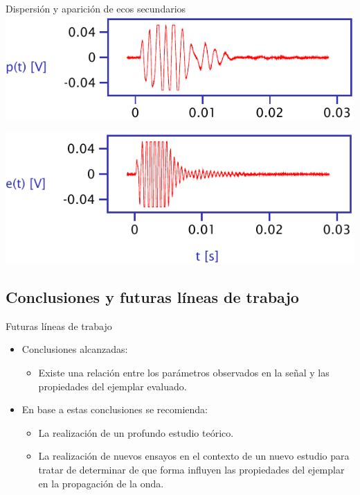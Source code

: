 \documentclass[utf8, compress]			{beamer}
\begin{document}
\begin{frame}{Dispersión y aparición de ecos secundarios}
    \includegraphics{scattering-palmera.pdf}\par
    \includegraphics{scattering-eucalipto.pdf}
\end{frame}


\subsection{Conclusiones y futuras líneas de trabajo}

\begin{frame}{Futuras líneas de trabajo}
    \begin{itemize}
	\item Conclusiones alcanzadas:
	    \begin{itemize}
		\item Existe una relación entre los parámetros observados
		    en la señal y las propiedades del ejemplar evaluado.
	    \end{itemize}
	\item En base a estas conclusiones se recomienda:
	    \begin{itemize}
		\item La realización de un profundo estudio teórico.
		\item La realización de nuevos ensayos en el contexto de un
		    nuevo estudio para tratar de determinar de que forma
		    influyen las propiedades del ejemplar en la propagación
		    de la onda.
	    \end{itemize}
    \end{itemize}
\end{frame}
\end{document}

